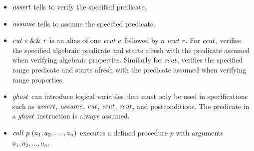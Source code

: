 \documentclass{article}
\begin{document}
\begin{itemize}
\item $\mathit{assert}$ tells \cryptoline to verify the specified predicate.
\item $\mathit{assume}$ tells \cryptoline to assume the specified predicate.
\item $\mathit{cut}\ e\ \&\&\ r$ is an alias of one $\mathit{ecut}\ e$ followed by
  a $\mathit{rcut}\ r$.
  For $\mathit{ecut}$, \cryptoline verifies the specified algebraic predicate
  and starts afresh with the predicate assumed when verifying algebraic
  properties.
  Similarly for $\mathit{rcut}$, \cryptoline verifies the specified range
  predicate and starts afresh with the predicate assumed when verifying
  range properties.
\item $\mathit{ghost}$ can introduce logical variables that must only be used
  in specifications such as $\mathit{assert}$, $\mathit{assume}$, $\mathit{cut}$, $\mathit{ecut}$,
  $\mathit{rcut}$, and postconditions.
  The predicate in a $\mathit{ghost}$ instruction is always assumed.
\item $\mathit{call}\ p\ (a_1, a_2, \ldots, a_n)$ executes a defined
  procedure $p$ with arguments $a_1, a_2, \ldots, a_n$.
\end{itemize}
\end{document}
